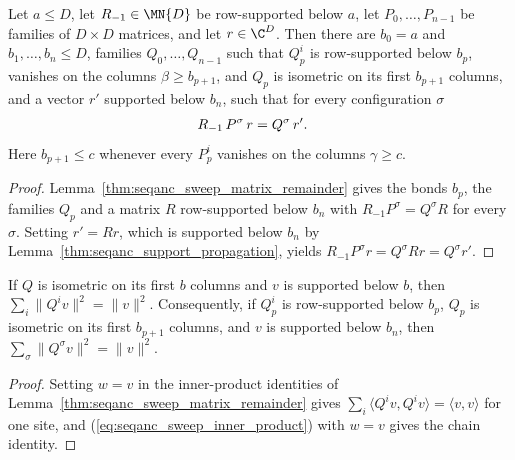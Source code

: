 \begin{lemma}
    \label{thm:seqanc_sweep}
    \leanok
    Let $a\le D$, let $R_{-1}\in\MN{D}$ be row-supported below $a$, let
    $P_0,\dots,P_{n-1}$ be families of $D\times D$ matrices, and let
    $r\in\C^D$. Then there are $b_0=a$ and $b_1,\dots,b_n\le D$, families
    $Q_0,\dots,Q_{n-1}$ such that $Q_p^i$ is row-supported below $b_p$,
    vanishes on the columns $\beta\ge b_{p+1}$, and $Q_p$ is isometric on its
    first $b_{p+1}$ columns, and a vector $r'$ supported below $b_n$, such
    that for every configuration $\sigma$
    \begin{align}
        R_{-1}\,P^\sigma\,r
         & =Q^\sigma\,r'.
        \notag
    \end{align}
    Here $b_{p+1}\le c$ whenever every $P_p^i$ vanishes on the columns
    $\gamma\ge c$.
\end{lemma}
\begin{proof}
    \leanok
    Lemma~\ref{thm:seqanc_sweep_matrix_remainder} gives the bonds $b_p$, the
    families $Q_p$ and a matrix $R$ row-supported below $b_n$ with
    $R_{-1}P^\sigma=Q^\sigma R$ for every $\sigma$. Setting $r'=Rr$, which is
    supported below $b_n$ by Lemma~\ref{thm:seqanc_support_propagation},
    yields $R_{-1}P^\sigma r=Q^\sigma Rr=Q^\sigma r'$.
\end{proof}

\begin{lemma}
    \label{thm:seqanc_norm}
    \leanok
    If $Q$ is isometric on its first $b$ columns and $v$ is supported below
    $b$, then $\sum_i\|Q^iv\|^2=\|v\|^2$. Consequently, if $Q_p^i$ is
    row-supported below $b_p$, $Q_p$ is isometric on its first $b_{p+1}$
    columns, and $v$ is supported below $b_n$, then
    $\sum_\sigma\|Q^\sigma v\|^2=\|v\|^2$.
\end{lemma}
\begin{proof}
    \leanok
    Setting $w=v$ in the inner-product identities of
    Lemma~\ref{thm:seqanc_sweep_matrix_remainder} gives $\sum_i\langle Q^iv,Q^iv\rangle
        =\langle v,v\rangle$ for one site, and
    (\ref{eq:seqanc_sweep_inner_product}) with $w=v$ gives the chain identity.
\end{proof}

